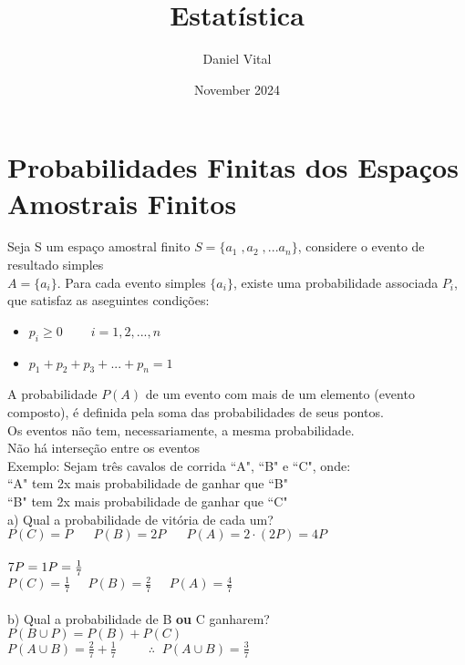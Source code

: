\documentclass{article}
\title{Estatística}
\author{Daniel Vital}
\date{November 2024}
\begin{document}
\maketitle

\section{Probabilidades Finitas dos Espaços Amostrais Finitos}
Seja S um espaço amostral finito $S=\{a_1\;,a_2\;,...a_n\}$, considere o evento de resultado simples\\$A=\{a_i\}$. Para cada evento simples $\{a_i\}$, existe uma probabilidade associada $P_i$, que satisfaz as aseguintes condições:
\begin{itemize}
    \item $p_i\geq 0\;\;\;\;\;\;\;\; i=1,2,...,n$
    \item $p_1+p_2+p_3+...+p_n=1$
\end{itemize}
A probabilidade $P(A)$ de um evento com mais de um elemento (evento composto), é definida pela soma das probabilidades de seus pontos.\\
Os eventos não tem, necessariamente, a mesma probabilidade.\\
Não há interseção entre os eventos\\

Exemplo: Sejam três cavalos de corrida ``A", ``B" e ``C", onde:\\
``A" tem 2x mais probabilidade de ganhar que ``B"\\
``B" tem 2x mais probabilidade de ganhar que ``C"\\

a) Qual a probabilidade de vitória de cada um?\\
$P(C) = P \;\;\;\;\;\; P(B)= 2P \;\;\;\;\;\; P(A)= 2\cdot(2P)=4P$\\

\\
$7P=1\\
P=\frac{1}{7}$\\

$P(C) = \frac{1}{7}\;\;\;\;\; P(B)=\frac{2}{7} \;\;\;\;\; P(A)= \frac{4}{7}$
\\\\


b) Qual a probabilidade de B \textbf{ou} C ganharem?\\
$P(B\cup P)=P(B)+P(C)$\\
$P(A \cup B)= \frac{2}{7} + \frac{1}{7}\;\;\;\;\;\;\;\;\; \therefore  \;\;P(A \cup B) = \frac{3}{7}$\\
\end{document}
